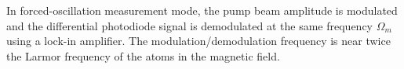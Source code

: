 In forced-oscillation measurement mode, the pump beam amplitude is
modulated and the differential photodiode signal is demodulated at the
same frequency $\Omega_m$ using a lock-in amplifier.  The
modulation/demodulation frequency is near twice the Larmor frequency
of the atoms in the magnetic field.







